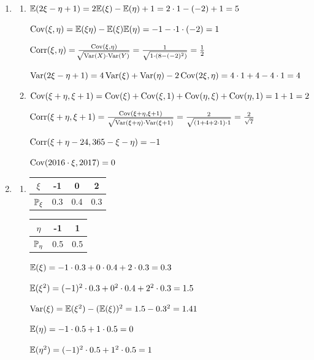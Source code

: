 \documentclass[12pt, a4paper]{article}\usepackage[]{graphicx}\usepackage[]{color}
\begin{document}
						\begin{enumerate}
							\item \begin{enumerate}
								\item $\E (2\xi - \eta +1) = 2 \E (\xi) - \E (\eta) + 1 = 2\cdot 1 - (-2) + 1 = 5 $

								$\Cov (\xi, \eta) = \E (\xi \eta) - \E(\xi) \E(\eta) = -1 - \cdot 1 \cdot (-2) = 1$

								$\Corr (\xi, \eta) = \frac{\Cov(\xi, \eta)}{\sqrt[]{\Var(X) \cdot \Var(Y)}} = \frac{1}{\sqrt{1 \cdot (8-(-2)^2)}} = \frac{1}{2}$

								$\Var (2\xi - \eta + 1) = 4\Var(\xi) + \Var(\eta) - 2 \Cov (2\xi, \eta) = 4 \cdot 1 + 4 - 4 \cdot 1 = 4$

								\item $\Cov(\xi + \eta, \xi + 1) = \Cov(\xi) + \Cov(\xi, 1) + \Cov(\eta, \xi) + \Cov(\eta, 1) = 1 +1 = 2$

								$\Corr(\xi + \eta , \xi + 1) = \frac{\Cov(\xi + \eta , \xi + 1)}{\sqrt{\Var(\xi + \eta)\cdot \Var (\xi + 1)}} = \frac{2}{\sqrt{(1+4+2\cdot 1) \cdot 1}} = \frac{2}{\sqrt{7}}$

								$\Corr(\xi + \eta - 24, 365 - \xi - \eta) = -1$
								
								$\Cov(2016\cdot \xi, 2017) = 0$

							\end{enumerate}
							\item \begin{enumerate}
								\item \begin{tabular}{c|ccc|}
									$\xi$ & -1 & 0 & 2 \\ \hline
									$\P_{\xi}$ & 0.3 & 0.4 & 0.3
								\end{tabular}
								\begin{tabular}{|c|cc}
									$\eta$ & -1 & 1 \\ \hline
									$\P_{\eta}$ & 0.5 & 0.5
								\end{tabular}

								$\E(\xi) = -1 \cdot 0.3 + 0 \cdot 0.4 + 2 \cdot 0.3 = 0.3$

								$\E (\xi^2) = (-1)^2 \cdot 0.3 + 0^2 \cdot 0.4 + 2^2 \cdot 0.3 = 1.5$

								$\Var(\xi) = \E(\xi^2) - (\E(\xi))^2 = 1.5 - 0.3^2 = 1.41$

								$\E(\eta) = -1 \cdot 0.5 + 1 \cdot 0.5 = 0$

								$\E(\eta^2) = (-1)^2 \cdot 0.5 + 1^2 \cdot 0.5 = 1$


\end{enumerate}
\end{enumerate}
\end{document}
